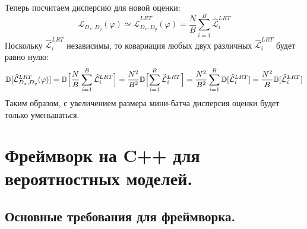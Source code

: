 Теперь посчитаем дисперсию для новой оценки:
$$\mathcal{L}_{D_x, D_y}(\varphi) \simeq \widehat{\mathcal{L}}_{D_x, D_y}^{LRT}(\varphi) = \frac{N}{B} \sum_{i=1}^B \widehat{\mathcal{L}}_{i}^{LRT}$$
Поскольку $\widehat{\mathcal{L}}_{i}^{LRT}$ независимы, то ковариация любых двух различных $\widehat{\mathcal{L}}_{i}^{LRT}$ будет равно нулю:
$$\mathbb{D}[\widehat{\mathcal{L}}_{D_x, D_y}^{LRT}(\varphi)] = \mathbb{D}\Bigl[\frac{N}{B} \sum_{i=1}^B \widehat{\mathcal{L}}_{i}^{LRT}\Bigr] = \frac{N^2}{B^2} \mathbb{D}\Bigl[\sum_{i=1}^B \widehat{\mathcal{L}}_{i}^{LRT}\Bigr] = \frac{N^2}{B^2} \sum_{i=1}^B \mathbb{D}[\widehat{\mathcal{L}}_{i}^{LRT}] = \frac{N^2}{B} \mathbb{D}[\widehat{\mathcal{L}}_{i}^{LRT}]$$
Таким образом, с увеличением размера мини-батча дисперсия оценки будет только уменьшаться.
\chapter{Фреймворк на C++ для вероятностных моделей.}
\section{Основные требования для фреймворка.}
